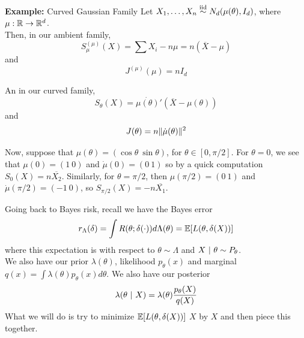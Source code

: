 
\begin{example}{\textbf{Example:} Curved Gaussian Family}
    Let $X_1, \ldots, X_n \overset{\text{iid}}{\sim} N_{d}(\mu(\theta), I_{d})$, where $\mu : \mathbb{R} \to \mathbb{R}^{d}$.\\

    Then, in our ambient family,
    \[ S_{\mu}^{(\mu)}(X) = \sum X_i - n\mu = n(\overline{X} - \mu) \]
    and
    \[ J^{(\mu)}(\mu) = nI_{d} \]

    An in our curved family,
    \[ S_{\theta}(X) = \dot{\mu(\theta)}'(\overline{X} - \mu(\theta)) \]
    and
    \[ J(\theta) = n\lVert {\dot{\mu}(\theta)} \rVert^2 \]

    Now, suppose that $\mu(\theta) = (\cos \theta\ \sin \theta)$, for $\theta \in [0, \pi/2]$. For $\theta = 0$, we see that $\mu(0) = (1\ 0)$ and $\dot{\mu}(0) = (0\ 1)$ so by a quick computation $S_{0}(X) = n\overline{X_2}$. Similarly, for $\theta = \pi/2$, then $\mu(\pi/2) = (0\ 1)$ and $\dot{\mu}(\pi/2) = (-1\ 0)$, so $S_{\pi/2}(X) = -n\overline{X_1}$. 
\end{example}

Going back to Bayes risk, recall we have the Bayes error
\[ r_{\Lambda}(\delta) = \int R(\theta; \delta(\cdot))d\Lambda(\theta) = \mathbb{E}[L(\theta, \delta(X))] \]
where this expectation is with respect to $\theta \sim \Lambda$ and $X \ |\  \theta \sim P_{\theta}$. \\

We also have our prior $\lambda(\theta)$, likelihood $p_{\theta}(x)$ and marginal $q(x) = \int \lambda(\theta)p_{\theta}(x)d\theta$. We also have our posterior
\[ \lambda(\theta \ |\  X) = \lambda(\theta)\frac{p_{\theta}(X)}{q(X)} \]
What we will do is try to minimize $\mathbb{E}[L(\theta, \delta(X))]$ $X$ by $X$ and then piece this together.\\

